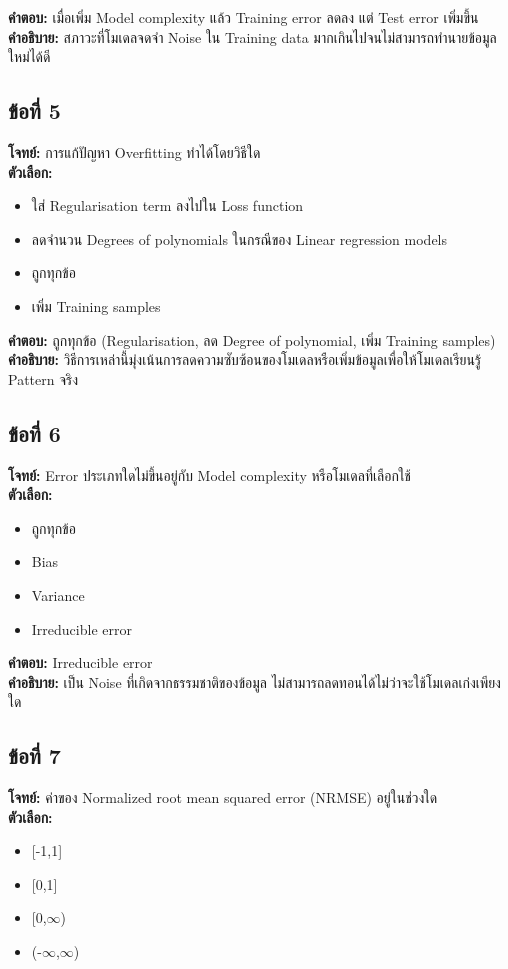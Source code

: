 \documentclass[12pt]{article}
\begin{document}
\textbf{คำตอบ:} เมื่อเพิ่ม Model complexity แล้ว Training error ลดลง แต่ Test error เพิ่มขึ้น\\
\textbf{คำอธิบาย:} สภาวะที่โมเดลจดจำ Noise ใน Training data มากเกินไปจนไม่สามารถทำนายข้อมูลใหม่ได้ดี

\subsection*{ข้อที่ 5}
\textbf{โจทย์:} การแก้ปัญหา Overfitting ทำได้โดยวิธีใด\\
\textbf{ตัวเลือก:}
\begin{itemize}
    \item ใส่ Regularisation term ลงไปใน Loss function
    \item ลดจำนวน Degrees of polynomials ในกรณีของ Linear regression models
    \item ถูกทุกข้อ
    \item เพิ่ม Training samples
\end{itemize}

\textbf{คำตอบ:} ถูกทุกข้อ (Regularisation, ลด Degree of polynomial, เพิ่ม Training samples)\\
\textbf{คำอธิบาย:} วิธีการเหล่านี้มุ่งเน้นการลดความซับซ้อนของโมเดลหรือเพิ่มข้อมูลเพื่อให้โมเดลเรียนรู้ Pattern จริง

\subsection*{ข้อที่ 6}
\textbf{โจทย์:} Error ประเภทใดไม่ขึ้นอยู่กับ Model complexity หรือโมเดลที่เลือกใช้\\
\textbf{ตัวเลือก:}
\begin{itemize}
    \item ถูกทุกข้อ
    \item Bias
    \item Variance
    \item Irreducible error
\end{itemize}

\textbf{คำตอบ:} Irreducible error\\
\textbf{คำอธิบาย:} เป็น Noise ที่เกิดจากธรรมชาติของข้อมูล ไม่สามารถลดทอนได้ไม่ว่าจะใช้โมเดลเก่งเพียงใด

\subsection*{ข้อที่ 7}
\textbf{โจทย์:} ค่าของ Normalized root mean squared error (NRMSE) อยู่ในช่วงใด\\
\textbf{ตัวเลือก:}
\begin{itemize}
    \item {[-1,1]}
    \item {[0,1]}
    \item {[0,$\infty$)}
    \item {(-$\infty$,$\infty$)}
\end{itemize}
\end{document}
